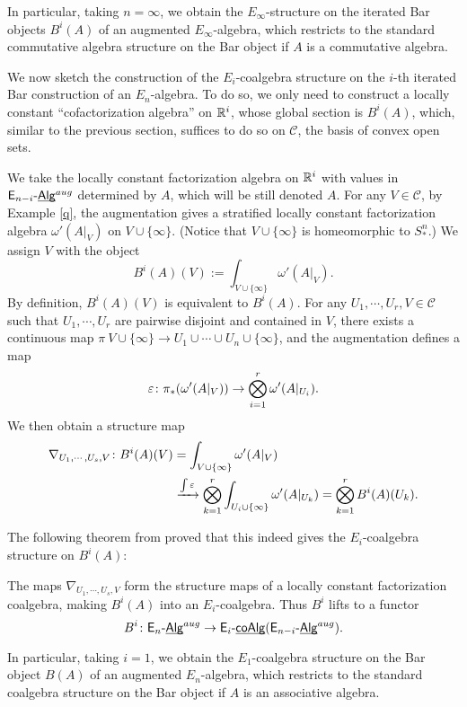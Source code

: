 \documentclass[twoside]{article}
\begin{document}
In particular, taking $n=\infty$, we obtain the $E_\infty$-structure on
the iterated Bar objects $B^i(A)$ of an augmented $E_\infty$-algebra, which 
restricts to the standard commutative algebra structure on the Bar object if $A$
is a commutative algebra.

We now sketch the construction of the $E_i$-coalgebra structure on the $i$-th
iterated Bar construction of an $E_n$-algebra. To do so, we only
need to construct a locally constant ``cofactorization algebra'' on $\mathbb{R}^i$,
whose global section is $B^i(A)$, which, similar to the previous section,
suffices to do so on $\mathscr C$, the basis of convex open sets.

We take the locally constant factorization algebra on $\mathbb{R}^i$ with values in
$\mathsf{E}_{n-i}\text{-}\underline{\smash{\mathsf{Alg}}}^{aug}$ determined by $A$, which will be still denoted $A$.
For any $V\in\mathscr C$, by Example \ref{q}, the augmentation
gives a stratified locally constant factorization algebra $\omega'(A|_V)$
on $V\cup\{\infty\}$. (Notice that $V\cup\{\infty\}$ is homeomorphic
to $S^n_*$.) We assign $V$ with the object $$B^i(A)(V):=\int_{V\cup\{\infty\}}
\omega'(A|_V).$$ By definition, $B^i(A)(V)$ is equivalent to $B^i(A)$. 
For any $U_1,\cdots,U_r,V\in\mathscr C$ such that $U_1,\cdots,U_r$ are
pairwise disjoint and contained in $V$, there exists a continuous map
$\pi\:V\cup\{\infty\}\to U_1\cup\cdots\cup U_n\cup\{\infty\}$, and
the augmentation defines a map $$\varepsilon\colon\pi_*(\omega'(A|_{V}))\to\bigotimes\limits_{i=1}^r
\omega'(A|_{U_i}).$$ We then obtain a structure map $$\begin{aligned}\nabla_{U_1,\cdots,U_s,V}\colon
B^i(A)(V)&=\int_{V\cup\{\infty\}}\omega'(A|_V)\\&\xrightarrow{\int\varepsilon}
\bigotimes\limits_{k=1}^r\int_{U_i\cup\{\infty\}}\omega'(A|_{U_k})
=\bigotimes\limits_{k=1}^rB^i(A)(U_k).\end{aligned}$$ 

The following theorem from \cite{GTZ12} proved that this indeed gives the
$E_i$-coalgebra structure on $B^i(A)$:

\begin{theorem}
The maps $\nabla_{U_1,\cdots,U_s,V}$ form the structure maps of a 
locally constant factorization coalgebra, making $B^i(A)$ into an 
$E_i$-coalgebra. Thus $B^i$ lifts to a functor $$B^i\colon\mathsf{E}_n\text{-}\underline{\smash{\mathsf{Alg}}}^{aug}\to
\mathsf{E}_i\text{-}\underline{\smash{\mathsf{coAlg}}}(\mathsf{E}_{n-i}\text{-}\underline{\smash{\mathsf{Alg}}}^{aug}).$$
\end{theorem}

In particular, taking $i=1$, we obtain the $E_1$-coalgebra structure on
the Bar object $B(A)$ of an augmented $E_n$-algebra, which 
restricts to the standard coalgebra structure on the Bar object if $A$
is an associative algebra. 

\printbibliography
\end{document}
